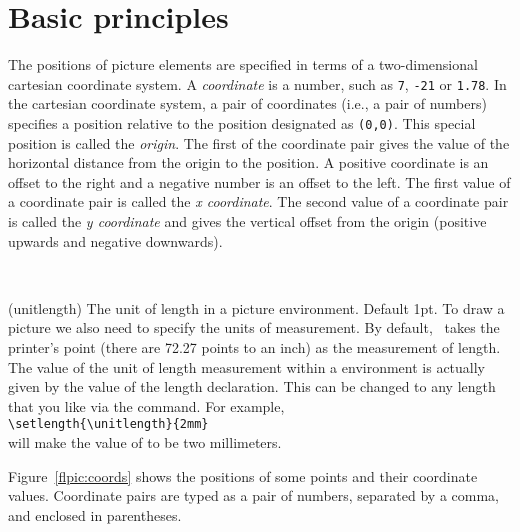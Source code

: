 \section{Basic principles}

    The positions of picture elements are specified in terms of a 
two-dimensional cartesian coordinate system. 
A \emph{coordinate} is a
number, such as \texttt{7}, \texttt{-21} or \texttt{1.78}. In the cartesian coordinate
system, a pair of coordinates (i.e., a pair of numbers) specifies a
position relative to the position designated as \texttt{(0,0)}. This special
position is called the \emph{origin}. 
The first of the coordinate pair
gives the value of the horizontal distance from the origin to the position.
A positive coordinate is an offset to the right and a negative number is
an offset to the left. The first value of a coordinate pair is called the
\emph{x coordinate}. 
The second value of a coordinate pair is called the
\emph{y coordinate} 
and gives the vertical offset from the origin (positive
upwards and negative downwards).

\begin{syntax}
\lnc{\unitlength} \\
\end{syntax}
\glossary(unitlength)
{}{The unit of length in a picture environment. Default 1pt.}
    To draw a picture we also need to specify the units of measurement.
By default, \ltx\ takes the printer's point (there are 72.27 points to
an inch) as the measurement of length. The value of the unit of 
length measurement
within a  environment is actually given by the value
of the \lnc{\unitlength} length declaration.
 This can be changed
to any length that you like via the \cmd{\setlength} command. For example, \\
\verb?\setlength{\unitlength}{2mm}? \\
will make the value of \lnc{\unitlength} to be two millimeters.

    Figure~\ref{flpic:coords} shows the positions of some points and their
coordinate values. Coordinate pairs are typed as a pair of numbers, separated
by a comma, and enclosed in parentheses.

